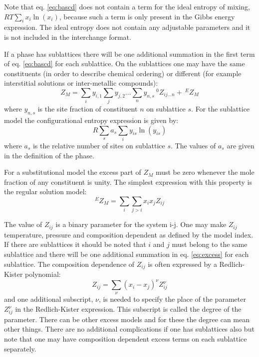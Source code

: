 \documentclass[12pt]{article}
\begin{document}
Note that eq.  \ref{eq:bascd} does not contain a term for the ideal
entropy of mixing, $RT\sum_i x_i\ln(x_i)$, because such a term is only
present in the Gibbs energy expression.  The ideal entropy does not
contain any adjustable parameters and it is not included in the
interchange format.

If a phase has sublattices there will be one additional summation in
the first term of eq.  \ref{eq:bascd} for each sublattice.  On the
sublattices one may have the same constituents (in order to describe
chemical ordering) or different (for example interstitial solutions or
inter-metallic compounds):
\begin{equation}
Z_M = \sum_i y_{i,1} \sum_j y_{j,2} ...  \sum_n y_{n,s} ~^0Z_{ij...n} + ~^EZ_M \label{eq:bassubl}
\end{equation}
where $y_{n,s}$ is the site fraction of constituent $n$ on sublattice
$s$.  For the sublattice model the configurational entropy expression
is given by:
\begin{equation}
R\sum_s a_s \sum_i y_{is} \ln(y_{is})
\end{equation}
where $a_s$ is the relative number of sites on sublattice $s$.   The
values of $a_s$ are given in the definition of the phase.

For a substitutional model the excess part of $Z_M$ must be zero
whenever the mole fraction of any constituent is unity.  The simplest
expression with this property is the regular solution model:
\begin{equation}
^EZ_M = \sum_i \sum_{j>i} x_i x_j Z_{ij} \label{eq:excess}
\end{equation}

The value of $Z_{ij}$ is a binary parameter for the system i-j.  One
may make $Z_{ij}$ temperature, pressure and composition dependent as
defined by the model index.  If there are sublattices it should be
noted that $i$ and $j$ must belong to the same sublattice and there
will be one additional summation in eq.  \ref{eq:excess} for each
sublattice.  The composition dependence of $Z_{ij}$ is often expressed
by a Redlich-Kister polynomial:
\begin{equation}
Z_{ij} = \sum_{\nu} (x_i - x_j)^{\nu} Z_{ij}^{\nu} \label{eq:rk}
\end{equation}
and one additional subscript, $\nu$, is needed to specify the place of
the parameter $Z_{ij}^{\nu}$ in the Redlich-Kister expression.  This
subscript is called the degree of the parameter.  There can be other
excess models and for these the degree can mean other things.  There
are no additional complications if one has sublattices also but note
that one may have composition dependent excess terms on each
sublattice separately.
\end{document}
